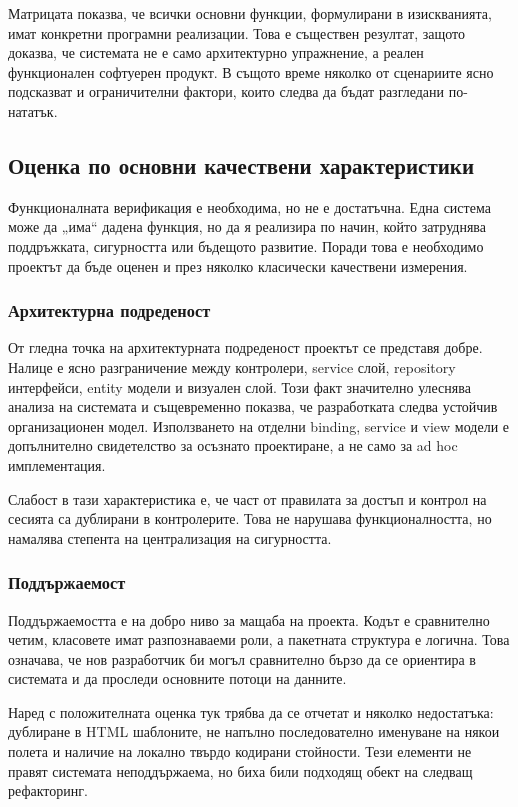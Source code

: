 Матрицата показва, че всички основни функции, формулирани в изискванията, имат конкретни програмни реализации. Това е съществен резултат, защото доказва, че системата не е само архитектурно упражнение, а реален функционален софтуерен продукт. В същото време няколко от сценариите ясно подсказват и ограничителни фактори, които следва да бъдат разгледани по-нататък.

\subsection{Оценка по основни качествени характеристики}

Функционалната верификация е необходима, но не е достатъчна. Една система може да „има“ дадена функция, но да я реализира по начин, който затруднява поддръжката, сигурността или бъдещото развитие. Поради това е необходимо проектът да бъде оценен и през няколко класически качествени измерения.

\subsubsection{Архитектурна подреденост}

От гледна точка на архитектурната подреденост проектът се представя добре. Налице е ясно разграничение между контролери, service слой, repository интерфейси, entity модели и визуален слой. Този факт значително улеснява анализа на системата и същевременно показва, че разработката следва устойчив организационен модел. Използването на отделни binding, service и view модели е допълнително свидетелство за осъзнато проектиране, а не само за ad hoc имплементация.

Слабост в тази характеристика е, че част от правилата за достъп и контрол на сесията са дублирани в контролерите. Това не нарушава функционалността, но намалява степента на централизация на сигурността.

\subsubsection{Поддържаемост}

Поддържаемостта е на добро ниво за мащаба на проекта. Кодът е сравнително четим, класовете имат разпознаваеми роли, а пакетната структура е логична. Това означава, че нов разработчик би могъл сравнително бързо да се ориентира в системата и да проследи основните потоци на данните.

Наред с положителната оценка тук трябва да се отчетат и няколко недостатъка: дублиране в HTML шаблоните, не напълно последователно именуване на някои полета и наличие на локално твърдо кодирани стойности. Тези елементи не правят системата неподдържаема, но биха били подходящ обект на следващ рефакторинг.

